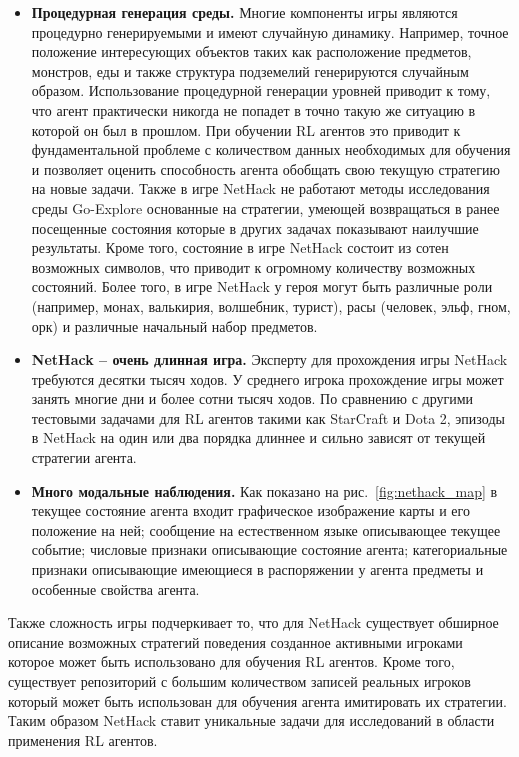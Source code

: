 \begin{itemize}
    \item \textbf{Процедурная генерация среды.} Многие компоненты игры являются процедурно генерируемыми и имеют случайную динамику. Например, точное положение интересующих объектов таких как расположение предметов, монстров, еды и также структура подземелий генерируются случайным образом. Использование процедурной генерации уровней приводит к тому, что агент практически никогда не попадет в точно такую же ситуацию в которой он был в прошлом. При обучении RL агентов это приводит к фундаментальной проблеме с количеством данных необходимых для обучения и позволяет оценить способность агента обобщать свою текущую стратегию на новые задачи. Также в игре NetHack не работают методы исследования среды Go-Explore \cite{ecoffet2019, ecoffet2021} основанные на стратегии, умеющей возвращаться в ранее посещенные состояния которые в других задачах показывают наилучшие результаты. Кроме того, состояние в игре NetHack состоит из сотен возможных символов, что приводит к огромному количеству возможных состояний. Более того, в игре NetHack у героя могут быть различные роли (например, монах, валькирия, волшебник, турист), расы (человек, эльф, гном, орк) и различные начальный набор предметов. 
    \item \textbf{NetHack -- очень длинная игра.} Эксперту для прохождения игры NetHack требуются десятки тысяч ходов. У среднего игрока прохождение игры может занять многие дни и более сотни тысяч ходов. По сравнению с другими тестовыми задачами для RL агентов такими как  StarCraft и Dota 2, эпизоды в NetHack на один или два порядка длиннее и сильно зависят от текущей стратегии агента. 
    \item \textbf{Много модальные наблюдения.} Как показано на рис.~\ref{fig:nethack_map} в текущее состояние агента входит графическое изображение карты и его положение на ней; сообщение на естественном языке описывающее текущее событие; числовые признаки описывающие состояние агента; категориальные признаки описывающие имеющиеся в распоряжении у агента предметы и особенные свойства агента. 
\end{itemize}

Также сложность игры подчеркивает то, что для NetHack существует обширное описание \cite{nethack_wiki} возможных стратегий поведения созданное активными игроками которое может быть использовано для обучения RL агентов. Кроме того, существует репозиторий с большим количеством записей реальных игроков \cite{alt} который может быть использован для обучения агента имитировать их стратегии. Таким образом NetHack ставит уникальные задачи для исследований в области применения RL агентов. 


